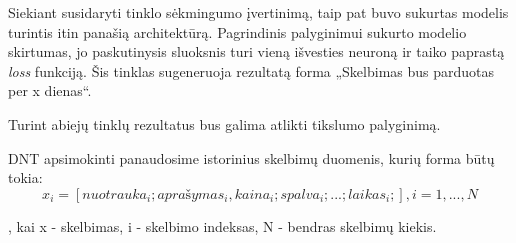 \documentclass{VUMIFPSkursinis}
\begin{document}
Siekiant susidaryti tinklo sėkmingumo įvertinimą, taip pat buvo sukurtas modelis turintis itin panašią architektūrą. Pagrindinis palyginimui sukurto modelio skirtumas, jo paskutinysis sluoksnis turi vieną išvesties neuroną ir taiko paprastą \textit{loss} funkciją. Šis tinklas sugeneruoja rezultatą forma „Skelbimas bus parduotas per x dienas“.

Turint abiejų tinklų rezultatus bus galima atlikti tikslumo palyginimą.

DNT apsimokinti panaudosime istorinius skelbimų duomenis, kurių forma būtų tokia: 
\begin{equation}
  x_i = [nuotrauka_i; aprašymas_i, kaina_i; spalva_i; ... ; laikas_i;], i = 1, ... , N
\end{equation}

, kai x - skelbimas, i - skelbimo indeksas, N - bendras skelbimų kiekis.




\end{document}
